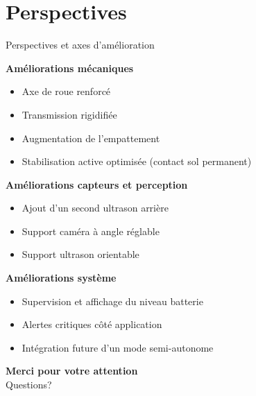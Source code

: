 \documentclass[10pt,aspectratio=169]{beamer}
\begin{document}
\section{Perspectives}
\begin{frame}{Perspectives et axes d’amélioration}

\textbf{Améliorations mécaniques}
\begin{itemize}
    \item Axe de roue renforcé
    \item Transmission rigidifiée
    \item Augmentation de l’empattement
    \item Stabilisation active optimisée (contact sol permanent)
\end{itemize}

\vspace{0.4cm}

\textbf{Améliorations capteurs et perception}
\begin{itemize}
    \item Ajout d’un second ultrason arrière
    \item Support caméra à angle réglable
    \item Support ultrason orientable
\end{itemize}

\vspace{0.4cm}

\textbf{Améliorations système}
\begin{itemize}
    \item Supervision et affichage du niveau batterie
    \item Alertes critiques côté application
    \item Intégration future d’un mode semi-autonome
\end{itemize}

\end{frame}

\begin{frame}
\centering
\Huge \textbf{Merci pour votre attention}\\[0.5cm]
\Large Questions?
\end{frame}

\begin{frame}
    \titlepage
\end{frame}
\end{document}
